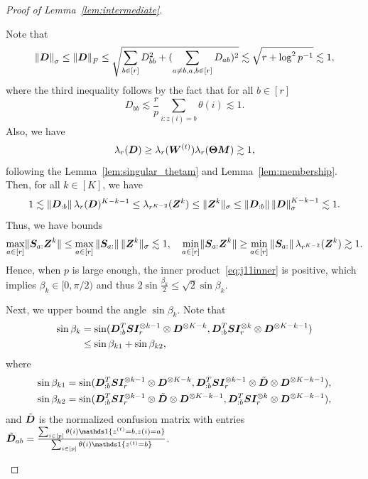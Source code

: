 \documentclass[lettersize,journal]{IEEEtran}
\theoremstyle{definition}
\theoremstyle{definition}
\begin{document}
\begin{proof}[Proof of Lemma~\ref{lem:intermediate}]
\begin{enumerate}
    Note that 
    \begin{equation}\label{eq:singular_Du}
        \onorm{\mD}_{\sigma} \leq \onorm{\mD}_{F} \leq  \sqrt{\sum_{b \in [r]} D_{bb}^2 + (\sum_{a \neq b, a ,b \in [r]} D_{ab} )^2} \lesssim \sqrt{r  + \log^2 p^{-1}} \lesssim 1,
    \end{equation}
    where the third inequality follows by the fact that for all $b \in [r]$ 
    \begin{equation}
        D_{bb} \lesssim \frac{r}{p} \sum_{i\colon z(i) = b} \theta(i) \lesssim 1.
    \end{equation}
    Also, we have 
    \begin{equation}\label{eq:singular_Dl}
        \lambda_r(\mD) \geq \lambda_r(\mW^{(t)}) \lambda_r(\mTheta \mM) \gtrsim 1,
    \end{equation}
    following the Lemma~\ref{lem:singular_thetam} and Lemma~\ref{lem:membership}. Then, for all $k \in [K]$, we have 
    \begin{equation}\label{eq:singular_z}
       1 \lesssim \onorm{\mD_{:b}} \lambda_r(\mD)^{K-k-1}  \leq \lambda_{r^{K-2}}(\mZ^{k}) \leq \onormSize{}{\mZ^k}_{\sigma} \leq \onorm{\mD_{:b}} \onorm{\mD}_{\sigma}^{K-k-1} \lesssim 1.
    \end{equation}
    Thus, we have bounds 
    \begin{equation}
         \max_{a \in [r]} \lVert\bm S_{a:} \bm Z^k\rVert \leq \max_{a \in [r]} \left\lVert\bm S_{a:}\right\rVert \lVert\bm Z^k\rVert_{\sigma} \lesssim 1, \quad \min_{a \in [r]} \lVert\bm S_{a:}\bm Z^k\rVert  \geq \min_{a \in [r]} \left\lVert\bm S_{a:}\right\rVert \lambda_{r^{K-2}}(\bm Z^{k}) \gtrsim 1.
    \end{equation}
    Hence, when $p$ is large enough, the inner product~\eqref{eq:j11inner} is positive, which implies $\beta_k \in [0, \pi/2)$ and thus $2 \sin \frac{\beta_k}{2} \leq \sqrt{2} \sin \beta_k$.
    
    Next, we upper bound the angle $\sin \beta_k$. Note that
    \begin{align}
         \sin \beta_k &= \sin ({\bm{D}_{:b}^{T} \bm S \bm I_r^{\otimes k-1} \otimes \bm{D}^{\otimes K-k} }, {\bm{D}_{:b}^{T} \bm S \bm I_r^{\otimes k} \otimes \bm{D}^{\otimes K-k-1} } )\\
         &\leq \sin \beta_{k1} + \sin \beta_{k2},
    \end{align}
    where
    \begin{align}
         \sin \beta_{k1} &= \sin ({\bm{D}_{:b}^{T} \bm S \bm I_r^{\otimes k-1} \otimes \bm{D}^{\otimes K-k} }, {\bm{D}_{:b}^{T} \bm S \bm I_r^{\otimes k-1} \otimes \tilde {\bm{D}} \otimes \bm{D}^{\otimes K-k-1} } ),\\
         \sin \beta_{k2} & = \sin ({\bm{D}_{:b}^{T} \bm S \bm I_r^{\otimes k-1} \otimes \tilde {\bm{D}} \otimes \bm{D}^{\otimes K-k-1} } , {\bm{D}_{:b}^{T} \bm S \bm I_r^{\otimes k} \otimes \bm{D}^{\otimes K-k-1} }   ),
    \end{align}
    and $\tilde {\bm{D}}$ is the normalized confusion matrix with entries $\tilde \mD_{ab} = \frac{\sum_{i \in [p]} \theta(i) \ind\{z^{(t)} = b, z(i) = a\}}{\sum_{i \in [p] }\theta(i) \ind\{z^{(t)} = b\}}$.
    

\end{enumerate}
\end{proof}
\end{document}
